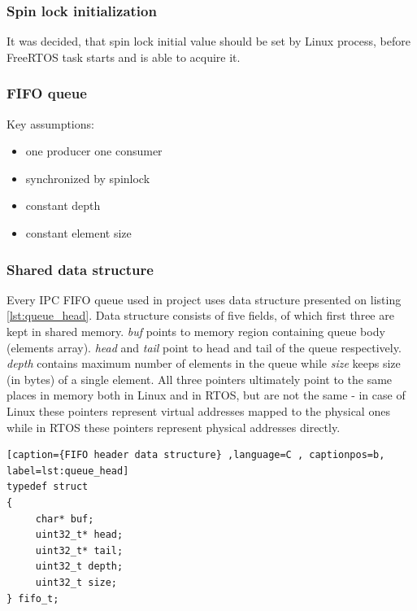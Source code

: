 \subsubsection{Spin lock initialization}
It was decided, that spin lock initial value should be set by Linux process, before FreeRTOS task starts and is able to acquire it.

\subsubsection{FIFO queue}

Key assumptions:
\begin{itemize}
\item one producer one consumer 
\item synchronized by spinlock
\item constant depth
\item constant element size
\end{itemize}

\subsubsection{Shared data structure}
\label{fifofmt}


Every IPC FIFO queue used in project uses data structure presented on listing \ref{lst:queue_head}. Data structure consists of five fields, of which first three are kept in shared memory. \emph{buf} points to memory region containing queue body (elements array). \emph{head} and \emph{tail} point to head and tail of the queue respectively. \emph{depth} contains maximum number of elements in the queue while \emph{size} keeps size (in bytes) of a single element. All three pointers ultimately point to the same places in memory both in Linux and in RTOS, but are not the same - in case of Linux these pointers represent virtual addresses mapped to the physical ones while in RTOS these pointers represent physical addresses directly.

\begin{lstlisting}[caption={FIFO header data structure} ,language=C , captionpos=b, label=lst:queue_head]
typedef struct
{
     char* buf;
     uint32_t* head;
     uint32_t* tail;
     uint32_t depth;
     uint32_t size;
} fifo_t;

\end{lstlisting}

